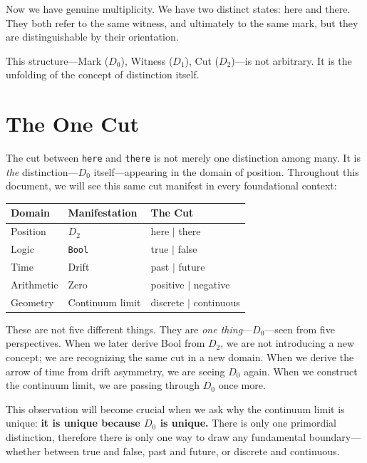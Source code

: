 \documentclass[11pt,a4paper]{book}
\begin{document}
Now we have genuine multiplicity. We have two distinct states: $\text{here}$ 
and $\text{there}$. They both refer to the same witness, and ultimately to 
the same mark, but they are distinguishable by their orientation.

This structure---Mark ($D_0$), Witness ($D_1$), Cut ($D_2$)---is not 
arbitrary. It is the unfolding of the concept of distinction itself.

\section{The One Cut}
\label{sec:unity-of-cut}

The cut between \texttt{here} and \texttt{there} is not merely one distinction among many. 
It is \emph{the} distinction---$D_0$ itself---appearing in the domain of position. Throughout 
this document, we will see this same cut manifest in every foundational context:

\begin{center}
\begin{tabular}{lll}
\hline
\textbf{Domain} & \textbf{Manifestation} & \textbf{The Cut} \\
\hline
Position & $D_2$ & here $\mid$ there \\
Logic & \texttt{Bool} & true $\mid$ false \\
Time & Drift & past $\mid$ future \\
Arithmetic & Zero & positive $\mid$ negative \\
Geometry & Continuum limit & discrete $\mid$ continuous \\
\hline
\end{tabular}
\end{center}

These are not five different things. They are \emph{one thing}---$D_0$---seen from five 
perspectives. When we later derive Bool from $D_2$, we are not introducing a new concept; 
we are recognizing the same cut in a new domain. When we derive the arrow of time from 
drift asymmetry, we are seeing $D_0$ again. When we construct the continuum limit, we 
are passing through $D_0$ once more.

This observation will become crucial when we ask why the continuum limit is unique: 
\textbf{it is unique because $D_0$ is unique.} There is only one primordial distinction, 
therefore there is only one way to draw any fundamental boundary---whether between true 
and false, past and future, or discrete and continuous.
\end{document}
